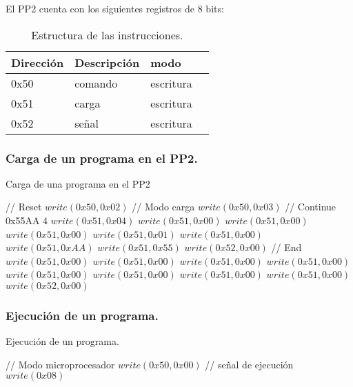 El PP2 cuenta con los siguientes registros de 8 bits:

\begin{table}[ht]
    \centering
    \begin{tabular}{|l|l|l|l|}
    \hline
    Direcci\'on  & Descripci\'on & modo  \\
    \hline
    0x50 & comando & escritura\\
    \hline
    0x51 & carga   & escritura\\
    \hline
    0x52 & se\~nal   & escritura \\
    \hline
\end{tabular}
\caption{\label{tab:pp2_reg}Estructura de las instrucciones.}
\end{table}
\newpage
\subsubsection{Carga de un programa en el PP2.}
\begin{algorithm}
    \caption{Carga de una programa en el PP2}\label{algo_pp2_load}
    \begin{algorithmic}[1]
    \State // {Reset}
    \State $write(0x50, 0x02)$
    \State // {Modo carga}
    \State $write(0x50, 0x03)$
    \State // {Continue 0x55AA 4}
    \State $write(0x51, 0x04)$
    \State $write(0x51,0x00)$
    \State $write(0x51,0x00)$
    \State $write(0x51,0x00)$
    \State $write(0x51,0x01)$
    \State $write(0x51,0x00)$
    \State $write(0x51,0xAA)$
    \State $write(0x51,0x55)$
    \State $write(0x52, 0x00)$
    \State // {End}
    \State $write(0x51,0x00)$
    \State $write(0x51,0x00)$
    \State $write(0x51,0x00)$
    \State $write(0x51,0x00)$
    \State $write(0x51,0x00)$
    \State $write(0x51,0x00)$
    \State $write(0x51,0x00)$
    \State $write(0x51,0x00)$
    \State $write(0x52,0x00)$
    \EndProcedure
    \end{algorithmic}
    \end{algorithm}

\subsubsection{Ejecuci\'on de un programa.}
\begin{algorithm}
    \caption{Ejecuci\'on de un programa.}\label{algo_pp2_exe}
    \begin{algorithmic}[1]
    \State // {Modo microprocesador}
    \State $write(0x50, 0x00)$
    \State // {se\~nal de ejecuci\'on}
    \State $write(0x08)$
    \EndProcedure
    \end{algorithmic}
    \end{algorithm}
\newpage
